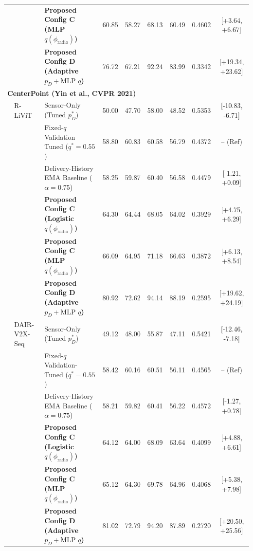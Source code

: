 \begin{table}[!t]
\begin{tabular}{lllcccccc}
 &  & \textbf{Proposed Config C (MLP $q(\phi_{\text{radio}})$)} & 60.85 & 58.27 & 68.13 & 60.49 & 0.4602 & [+3.64, +6.67] \\
 &  & \textbf{Proposed Config D (Adaptive $p_D + \text{MLP } q$)} & 76.72 & 67.21 & 92.24 & 83.99 & 0.3342 & [+19.34, +23.62] \\
\midrule
\multicolumn{9}{l}{\textbf{CenterPoint (Yin et al., CVPR 2021)}} \\
\midrule
 & R-LiViT & Sensor-Only (Tuned $p_D^*$) & 50.00 & 47.70 & 58.00 & 48.52 & 0.5353 & [-10.83, -6.71] \\
 &  & Fixed-$q$ Validation-Tuned ($q^*=0.55$) & 58.80 & 60.83 & 60.58 & 56.79 & 0.4372 & -- (Ref) \\
 &  & Delivery-History EMA Baseline ($\alpha=0.75$) & 58.25 & 59.87 & 60.40 & 56.58 & 0.4479 & [-1.21, +0.09] \\
 &  & \textbf{Proposed Config C (Logistic $q(\phi_{\text{radio}})$)} & 64.30 & 64.44 & 68.05 & 64.02 & 0.3929 & [+4.75, +6.29] \\
 &  & \textbf{Proposed Config C (MLP $q(\phi_{\text{radio}})$)} & 66.09 & 64.95 & 71.18 & 66.63 & 0.3872 & [+6.13, +8.54] \\
 &  & \textbf{Proposed Config D (Adaptive $p_D + \text{MLP } q$)} & 80.92 & 72.62 & 94.14 & 88.19 & 0.2595 & [+19.62, +24.19] \\
\midrule
 & DAIR-V2X-Seq & Sensor-Only (Tuned $p_D^*$) & 49.12 & 48.00 & 55.87 & 47.11 & 0.5421 & [-12.46, -7.18] \\
 &  & Fixed-$q$ Validation-Tuned ($q^*=0.55$) & 58.42 & 60.16 & 60.51 & 56.11 & 0.4565 & -- (Ref) \\
 &  & Delivery-History EMA Baseline ($\alpha=0.75$) & 58.21 & 59.82 & 60.41 & 56.22 & 0.4572 & [-1.27, +0.78] \\
 &  & \textbf{Proposed Config C (Logistic $q(\phi_{\text{radio}})$)} & 64.12 & 64.00 & 68.09 & 63.64 & 0.4099 & [+4.88, +6.61] \\
 &  & \textbf{Proposed Config C (MLP $q(\phi_{\text{radio}})$)} & 65.12 & 64.30 & 69.78 & 64.96 & 0.4068 & [+5.38, +7.98] \\
 &  & \textbf{Proposed Config D (Adaptive $p_D + \text{MLP } q$)} & 81.02 & 72.79 & 94.20 & 87.89 & 0.2720 & [+20.50, +25.56] \\
\bottomrule
\end{tabular}
\end{table}
